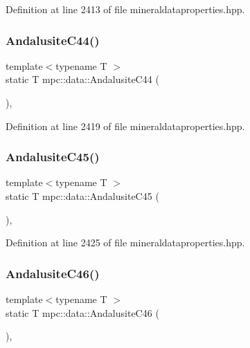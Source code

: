 Definition at line 2413 of file mineraldataproperties.\+hpp.

\mbox{\label{namespacempc_1_1data_ad87279e33aa97a20c810a4c969ac5b59}} 
\subsubsection{\texorpdfstring{Andalusite\+C44()}{AndalusiteC44()}}
{\footnotesize\ttfamily template$<$typename T $>$ \\
static T mpc\+::data\+::\+Andalusite\+C44 (\begin{DoxyParamCaption}{ }\end{DoxyParamCaption})\hspace{0.3cm}{\ttfamily [inline]}, {\ttfamily [static]}}



Definition at line 2419 of file mineraldataproperties.\+hpp.

\mbox{\label{namespacempc_1_1data_a3f4016cd70c9db19c852f6ed94dc6574}} 
\subsubsection{\texorpdfstring{Andalusite\+C45()}{AndalusiteC45()}}
{\footnotesize\ttfamily template$<$typename T $>$ \\
static T mpc\+::data\+::\+Andalusite\+C45 (\begin{DoxyParamCaption}{ }\end{DoxyParamCaption})\hspace{0.3cm}{\ttfamily [inline]}, {\ttfamily [static]}}



Definition at line 2425 of file mineraldataproperties.\+hpp.

\mbox{\label{namespacempc_1_1data_a4e47f7a853bc1b31ae29c43c712a9a9f}} 
\subsubsection{\texorpdfstring{Andalusite\+C46()}{AndalusiteC46()}}
{\footnotesize\ttfamily template$<$typename T $>$ \\
static T mpc\+::data\+::\+Andalusite\+C46 (\begin{DoxyParamCaption}{ }\end{DoxyParamCaption})\hspace{0.3cm}{\ttfamily [inline]}, {\ttfamily [static]}}



